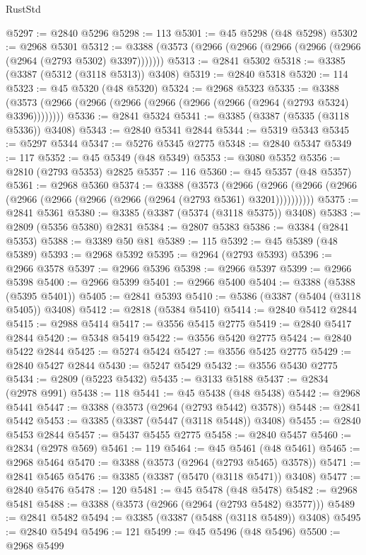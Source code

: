 \begin{lexlean}{RustStd}
\begin{coremodule}
@5297 := @2840 @5296
@5298 := 113
@5301 := @45 @5298 (@48 @5298)
@5302 := @2968 @5301
@5312 := @3388 (@3573 (@2966 (@2966 (@2966 (@2966 (@2966 (@2964 (@2793 @5302) @3397)))))))
@5313 := @2841 @5302
@5318 := @3385 (@3387 (@5312 (@3118 @5313)) @3408)
@5319 := @2840 @5318
@5320 := 114
@5323 := @45 @5320 (@48 @5320)
@5324 := @2968 @5323
@5335 := @3388 (@3573 (@2966 (@2966 (@2966 (@2966 (@2966 (@2966 (@2964 (@2793 @5324) @3396))))))))
@5336 := @2841 @5324
@5341 := @3385 (@3387 (@5335 (@3118 @5336)) @3408)
@5343 := @2840 @5341 @2844
@5344 := @5319 @5343
@5345 := @5297 @5344
@5347 := @5276 @5345 @2775
@5348 := @2840 @5347
@5349 := 117
@5352 := @45 @5349 (@48 @5349)
@5353 := @3080 @5352
@5356 := @2810 (@2793 @5353) @2825
@5357 := 116
@5360 := @45 @5357 (@48 @5357)
@5361 := @2968 @5360
@5374 := @3388
    (@3573
      (@2966 (@2966 (@2966 (@2966 (@2966 (@2966 (@2966 (@2966 (@2964 (@2793 @5361) @3201))))))))))
@5375 := @2841 @5361
@5380 := @3385 (@3387 (@5374 (@3118 @5375)) @3408)
@5383 := @2809 (@5356 @5380) @2831
@5384 := @2807 @5383
@5386 := @3384 (@2841 @5353)
@5388 := @3389 @50 @81
@5389 := 115
@5392 := @45 @5389 (@48 @5389)
@5393 := @2968 @5392
@5395 := @2964 (@2793 @5393)
@5396 := @2966 @3578
@5397 := @2966 @5396
@5398 := @2966 @5397
@5399 := @2966 @5398
@5400 := @2966 @5399
@5401 := @2966 @5400
@5404 := @3388 (@5388 (@5395 @5401))
@5405 := @2841 @5393
@5410 := @5386 (@3387 (@5404 (@3118 @5405)) @3408)
@5412 := @2818 (@5384 @5410)
@5414 := @2840 @5412 @2844
@5415 := @2988 @5414
@5417 := @3556 @5415 @2775
@5419 := @2840 @5417 @2844
@5420 := @5348 @5419
@5422 := @3556 @5420 @2775
@5424 := @2840 @5422 @2844
@5425 := @5274 @5424
@5427 := @3556 @5425 @2775
@5429 := @2840 @5427 @2844
@5430 := @5247 @5429
@5432 := @3556 @5430 @2775
@5434 := @2809 (@5223 @5432)
@5435 := @3133 @5188
@5437 := @2834 (@2978 @991)
@5438 := 118
@5441 := @45 @5438 (@48 @5438)
@5442 := @2968 @5441
@5447 := @3388 (@3573 (@2964 (@2793 @5442) @3578))
@5448 := @2841 @5442
@5453 := @3385 (@3387 (@5447 (@3118 @5448)) @3408)
@5455 := @2840 @5453 @2844
@5457 := @5437 @5455 @2775
@5458 := @2840 @5457
@5460 := @2834 (@2978 @569)
@5461 := 119
@5464 := @45 @5461 (@48 @5461)
@5465 := @2968 @5464
@5470 := @3388 (@3573 (@2964 (@2793 @5465) @3578))
@5471 := @2841 @5465
@5476 := @3385 (@3387 (@5470 (@3118 @5471)) @3408)
@5477 := @2840 @5476
@5478 := 120
@5481 := @45 @5478 (@48 @5478)
@5482 := @2968 @5481
@5488 := @3388 (@3573 (@2966 (@2964 (@2793 @5482) @3577)))
@5489 := @2841 @5482
@5494 := @3385 (@3387 (@5488 (@3118 @5489)) @3408)
@5495 := @2840 @5494
@5496 := 121
@5499 := @45 @5496 (@48 @5496)
@5500 := @2968 @5499

\end{coremodule}
\end{lexlean}
